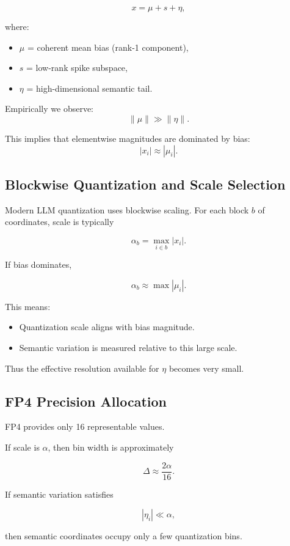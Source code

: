\[
x = \mu + s + \eta,
\]

where:
\begin{itemize}
\item $\mu$ = coherent mean bias (rank-1 component),
\item $s$ = low-rank spike subspace,
\item $\eta$ = high-dimensional semantic tail.
\end{itemize}

Empirically we observe:
\[
\|\mu\| \gg \|\eta\|.
\]

This implies that elementwise magnitudes are dominated by bias:
\[
|x_i| \approx |\mu_i|.
\]

\subsection{Blockwise Quantization and Scale Selection}

Modern LLM quantization uses blockwise scaling.
For each block $b$ of coordinates, scale is typically

\[
\alpha_b = \max_{i \in b} |x_i|.
\]

If bias dominates,

\[
\alpha_b \approx \max |\mu_i|.
\]

This means:
\begin{itemize}
\item Quantization scale aligns with bias magnitude.
\item Semantic variation is measured relative to this large scale.
\end{itemize}

Thus the effective resolution available for $\eta$ becomes very small.

\subsection{FP4 Precision Allocation}

FP4 provides only 16 representable values.

If scale is $\alpha$, then bin width is approximately

\[
\Delta \approx \frac{2\alpha}{16}.
\]

If semantic variation satisfies

\[
|\eta_i| \ll \alpha,
\]

then semantic coordinates occupy only a few quantization bins.

